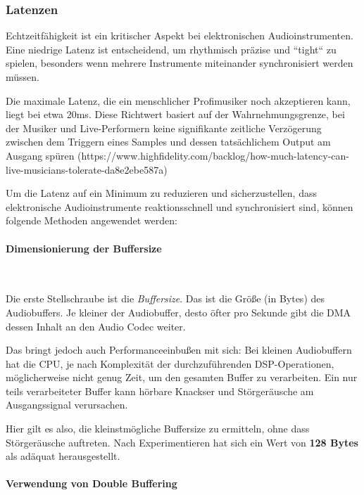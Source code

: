 \subsubsection{Latenzen}


Echtzeitfähigkeit ist ein kritischer Aspekt bei elektronischen Audioinstrumenten. 
Eine niedrige Latenz ist entscheidend, um rhythmisch präzise und ``tight`` zu spielen, besonders wenn mehrere Instrumente miteinander synchronisiert werden müssen.

Die maximale Latenz, die ein menschlicher Profimusiker noch akzeptieren kann, liegt bei etwa 20ms. Diese Richtwert basiert auf der Wahrnehmungsgrenze, bei der Musiker und Live-Performern keine signifikante zeitliche Verzögerung zwischen dem Triggern eines Samples und dessen tatsächlichem Output am Ausgang spüren (https://www.highfidelity.com/backlog/how-much-latency-can-live-musicians-tolerate-da8e2ebe587a)

Um die Latenz auf ein Minimum zu reduzieren und sicherzustellen, dass elektronische Audioinstrumente reaktionsschnell und synchronisiert sind, können folgende Methoden angewendet werden:

\paragraph{Dimensionierung der Buffersize}\

Die erste Stellschraube ist die \textit{Buffersize}.
Das ist die Größe (in Bytes) des Audiobuffers.
Je kleiner der Audiobuffer, desto öfter pro Sekunde gibt die DMA dessen Inhalt an den Audio Codec weiter.

Das bringt jedoch auch Performanceeinbußen mit sich: Bei kleinen Audiobuffern hat die CPU, je nach Komplexität der durchzuführenden DSP-Operationen, möglicherweise nicht genug Zeit, um den gesamten Buffer zu verarbeiten.
Ein nur teils verarbeiteter Buffer kann hörbare Knackser und Störgeräusche am Ausgangssignal verursachen.

Hier gilt es also, die kleinstmögliche Buffersize zu ermitteln, ohne dass Störgeräusche auftreten.
Nach Experimentieren hat sich ein Wert von \textbf{128 Bytes} als adäquat herausgestellt.

\paragraph{Verwendung von Double Buffering}\


